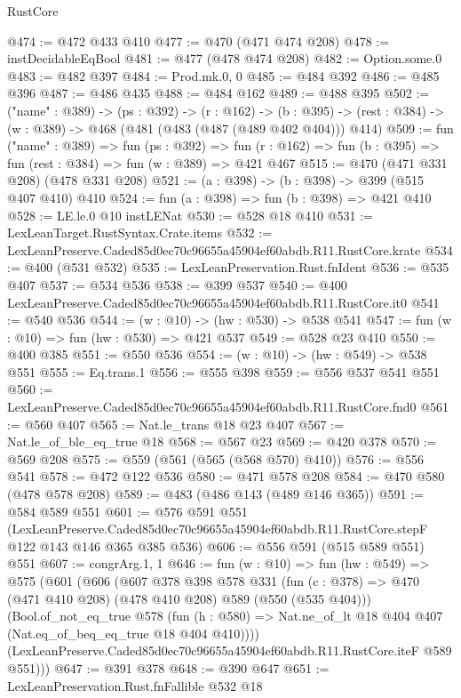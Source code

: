 \begin{lexlean}{RustCore}
\begin{coremodule}
@474 := @472 @433 @410
@477 := @470 (@471 @474 @208)
@478 := instDecidableEqBool
@481 := @477 (@478 @474 @208)
@482 := Option.some.{0}
@483 := @482 @397
@484 := Prod.mk.{0, 0}
@485 := @484 @392
@486 := @485 @396
@487 := @486 @435
@488 := @484 @162
@489 := @488 @395
@502 := ("name" : @389) ->
  (ps : @392) ->
  (r : @162) ->
  (b : @395) -> (rest : @384) -> (w : @389) -> @468 (@481 (@483 (@487 (@489 @402 @404))) @414)
@509 := fun ("name" : @389) =>
  fun (ps : @392) =>
  fun (r : @162) => fun (b : @395) => fun (rest : @384) => fun (w : @389) => @421 @467
@515 := @470 (@471 @331 @208) (@478 @331 @208)
@521 := (a : @398) -> (b : @398) -> @399 (@515 @407 @410) @410
@524 := fun (a : @398) => fun (b : @398) => @421 @410
@528 := LE.le.{0} @10 instLENat
@530 := @528 @18 @410
@531 := LexLeanTarget.RustSyntax.Crate.items
@532 := LexLeanPreserve.Caded85d0ec70c96655a45904ef60abdb.R11.RustCore.krate
@534 := @400 (@531 @532)
@535 := LexLeanPreservation.Rust.fnIdent
@536 := @535 @407
@537 := @534 @536
@538 := @399 @537
@540 := @400 LexLeanPreserve.Caded85d0ec70c96655a45904ef60abdb.R11.RustCore.it0
@541 := @540 @536
@544 := (w : @10) -> (hw : @530) -> @538 @541
@547 := fun (w : @10) => fun (hw : @530) => @421 @537
@549 := @528 @23 @410
@550 := @400 @385
@551 := @550 @536
@554 := (w : @10) -> (hw : @549) -> @538 @551
@555 := Eq.trans.{1}
@556 := @555 @398
@559 := @556 @537 @541 @551
@560 := LexLeanPreserve.Caded85d0ec70c96655a45904ef60abdb.R11.RustCore.fnd0
@561 := @560 @407
@565 := Nat.le_trans @18 @23 @407
@567 := Nat.le_of_ble_eq_true @18
@568 := @567 @23
@569 := @420 @378
@570 := @569 @208
@575 := @559 (@561 (@565 (@568 @570) @410))
@576 := @556 @541
@578 := @472 @122 @536
@580 := @471 @578 @208
@584 := @470 @580 (@478 @578 @208)
@589 := @483 (@486 @143 (@489 @146 @365))
@591 := @584 @589 @551
@601 := @576
    @591
    @551
    (LexLeanPreserve.Caded85d0ec70c96655a45904ef60abdb.R11.RustCore.stepF
      @122
      @143
      @146
      @365
      @385
      @536)
@606 := @556 @591 (@515 @589 @551) @551
@607 := congrArg.{1, 1}
@646 := fun (w : @10) =>
  fun (hw : @549) =>
  @575
    (@601
      (@606
        (@607
          @378
          @398
          @578
          @331
          (fun (c : @378) => @470 (@471 @410 @208) (@478 @410 @208) @589 (@550 (@535 @404)))
          (Bool.of_not_eq_true
            @578
            (fun (h : @580) => Nat.ne_of_lt @18 @404 @407 (Nat.eq_of_beq_eq_true @18 @404 @410))))
        (LexLeanPreserve.Caded85d0ec70c96655a45904ef60abdb.R11.RustCore.iteF @589 @551)))
@647 := @391 @378
@648 := @390 @647
@651 := LexLeanPreservation.Rust.fnFallible @532 @18

\end{coremodule}
\end{lexlean}
